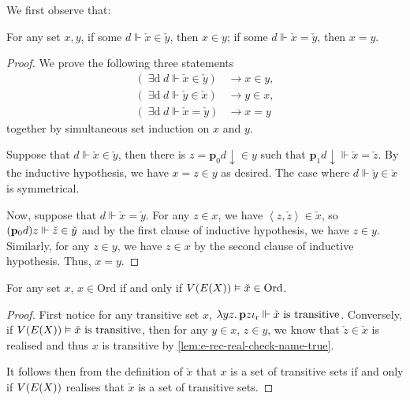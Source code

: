 \documentclass[12pt,openany]{book}
\theoremstyle{plain}
\theoremstyle{definition}
\newcommand\tuple[1]{\left\langle #1 \right\rangle}
\newcommand\opE[1]{\mathop{\exists #1}}
\newcommand\oplam[1]{\mathop{\lambda #1.}}
\newcommand\Ord{\mathrm{Ord}}
\newcommand\bp{\mathbf{p}}
\newcommand\ior{\iota_\textup{r}}
\begin{document}
We first observe that:
\begin{lemma}
  \label{lem:e-rec-real-check-name-true}
  For any set $x, y$, if some $d \Vdash \check{x} \in \check{y}$, then $x \in y$; if some $d \Vdash \check{x} = \check{y}$, then $x = y$.
\end{lemma}

\begin{proof}
  We prove the following three statements
  \begin{align*}
    \left(\opE{d} d \Vdash \check{x} \in \check{y}\right) & \rightarrow x \in y, \\
    \left(\opE{d} d \Vdash \check{y} \in \check{x}\right) & \rightarrow y \in x, \\
    \left(\opE{d} d \Vdash \check{x} = \check{y}\right)   & \rightarrow x = y
  \end{align*}
  together by simultaneous set induction on $x$ and $y$.

  Suppose that $d \Vdash \check{x} \in \check{y}$, then there is $z = \bp_0 d {\downarrow} \in y$ such that $\bp_1 d {\downarrow} \Vdash \check{x} = \check{z}$. By the inductive hypothesis, we have $x = z \in y$ as desired. The case where $d \Vdash \check{y} \in \check{x}$ is symmetrical.

  Now, suppose that $d \Vdash \check{x} = \check{y}$. For any $z \in x$, we have $\tuple{z, \check{z}} \in \check{x}$, so $\mleft(\bp_0 d\mright) z \Vdash \check{z} \in \check{y}$ and by the first clause of inductive hypothesis, we have $z \in y$. Similarly, for any $z \in y$, we have $z \in x$ by the second clause of inductive hypothesis. Thus, $x = y$.
\end{proof}

\begin{corollary}
  \label{cor:e-rec-real-check-ord-true}
  For any set $x$, $x \in \Ord$ if and only if $V\mleft(E\mleft(X\mright)\mright) \vDash \check{x} \in \Ord$.
\end{corollary}

\begin{proof}
  First notice for any transitive set $x$, $\oplam{yz} \bp z \ior \Vdash \text{$\check{x}$ is transitive}$. Conversely, if $V\mleft(E\mleft(X\mright)\mright) \vDash \text{$\check{x}$ is transitive}$, then for any $y \in x$, $z \in y$, we know that $\check{z} \in \check{x}$ is realised and thus $x$ is transitive by \autoref{lem:e-rec-real-check-name-true}.

  It follows then from the definition of $\check{x}$ that $x$ is a set of transitive sets if and only if $V\mleft(E\mleft(X\mright)\mright)$ realises that $\check{x}$ is a set of transitive sets.
\end{proof}
\end{document}
